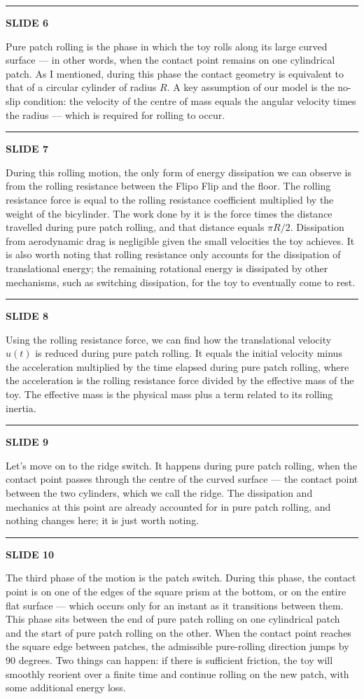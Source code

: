 \documentclass[a4paper,11pt]{article}
\newcommand{\slidetitle}[1]{{\small\textbf{SLIDE #1}}\par\smallskip}
\newcommand{\slidedivider}{\vspace{0.7em}\noindent\rule{\textwidth}{0.4pt}\vspace{0.7em}}
\begin{document}
\slidedivider

\slidetitle{6}
Pure patch rolling is the phase in which the toy rolls along its large curved surface --- in other words, when the contact point remains on one cylindrical patch. As I mentioned, during this phase the contact geometry is equivalent to that of a circular cylinder of radius $R$. A key assumption of our model is the no-slip condition: the velocity of the centre of mass equals the angular velocity times the radius --- which is required for rolling to occur.

\slidedivider

\slidetitle{7}
During this rolling motion, the only form of energy dissipation we can observe is from the rolling resistance between the Flipo Flip and the floor. The rolling resistance force is equal to the rolling resistance coefficient multiplied by the weight of the bicylinder. The work done by it is the force times the distance travelled during pure patch rolling, and that distance equals $\pi R/2$. Dissipation from aerodynamic drag is negligible given the small velocities the toy achieves. It is also worth noting that rolling resistance only accounts for the dissipation of translational energy; the remaining rotational energy is dissipated by other mechanisms, such as switching dissipation, for the toy to eventually come to rest.

\slidedivider

\slidetitle{8}
Using the rolling resistance force, we can find how the translational velocity $u(t)$ is reduced during pure patch rolling. It equals the initial velocity minus the acceleration multiplied by the time elapsed during pure patch rolling, where the acceleration is the rolling resistance force divided by the effective mass of the toy. The effective mass is the physical mass plus a term related to its rolling inertia.

\slidedivider

\slidetitle{9}
Let's move on to the ridge switch. It happens during pure patch rolling, when the contact point passes through the centre of the curved surface --- the contact point between the two cylinders, which we call the ridge. The dissipation and mechanics at this point are already accounted for in pure patch rolling, and nothing changes here; it is just worth noting.

\slidedivider

\slidetitle{10}
The third phase of the motion is the patch switch. During this phase, the contact point is on one of the edges of the square prism at the bottom, or on the entire flat surface --- which occurs only for an instant as it transitions between them. This phase sits between the end of pure patch rolling on one cylindrical patch and the start of pure patch rolling on the other. When the contact point reaches the square edge between patches, the admissible pure-rolling direction jumps by 90 degrees. Two things can happen: if there is sufficient friction, the toy will smoothly reorient over a finite time and continue rolling on the new patch, with some additional energy loss.
\end{document}
